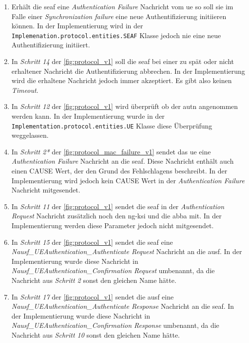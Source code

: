 \begin{enumerate}
\item Erhält die \gls{seaf} eine \textit{Authentication Failure} Nachricht vom \gls{ue} so soll sie im Falle einer \textit{Synchronization failure} eine neue Authentifizierung initiieren können.
In der Implementierung wird in der \lstinline{Implemenation.protocol.entities.SEAF} Klasse jedoch nie eine neue Authentifizierung initiiert.

\item In \textit{Schritt 14} der \cref{fig:protocol_v1} soll die \gls{seaf} bei einer zu spät oder nicht erhaltener Nachricht die Authentifizierung abbrechen.
In der Implementierung wird die erhaltene Nachricht jedoch immer akzeptiert.
Es gibt also keinen \textit{Timeout}.

\item In \textit{Schritt 12} der \cref{fig:protocol_v1} wird überprüft ob der \gls{autn} angenommen werden kann.
In der Implementierung wurde in der \lstinline{Implementation.protocol.entities.UE} Klasse diese Überprüfung weggelassen.

\item In \textit{Schritt 2*} der \cref{fig:protocol_mac_failure_v1} sendet das \gls{ue} eine \textit{Authentication Failure} Nachricht an die \gls{seaf}.
Diese Nachricht enthält auch einen CAUSE Wert, der den Grund des Fehlschlagens beschreibt.
In der Implementierung wird jedoch kein CAUSE Wert in der \textit{Authentication Failure} Nachricht mitgesendet.

\item In \textit{Schritt 11} der \cref{fig:protocol_v1} sendet die \gls{seaf} in der \textit{Authentication Request} Nachricht zusätzlich noch den \gls{ng-ksi} und die \gls{abba} mit.
In der Implementierung werden diese Parameter jedoch nicht mitgesendet.

\item In \textit{Schritt 15} der \cref{fig:protocol_v1} sendet die \gls{seaf} eine \textit{Nausf\_UEAuthentication\_Authenticate Request} Nachricht an die \gls{ausf}.
In der Implementierung wurde diese Nachricht in \textit{Nausf\_UEAuthentication\_Confirmation Request} umbenannt, da die Nachricht aus \textit{Schritt 2} sonst den gleichen Name hätte.

\item In \textit{Schritt 17} der \cref{fig:protocol_v1} sendet die \gls{ausf} eine \textit{Nausf\_UEAuthentication\_Authenticate Response} Nachricht an die \gls{seaf}.
In der Implementierung wurde diese Nachricht in \textit{Nausf\_UEAuthentication\_Confirmation Response} umbenannt, da die Nachricht aus \textit{Schritt 10} sonst den gleichen Name hätte.


\end{enumerate}
